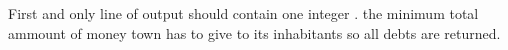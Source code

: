 First and only line of output should contain one integer . the minimum total ammount of money town  has to give to its inhabitants so all debts are returned.  

\